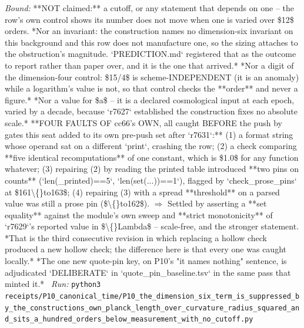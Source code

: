 \begin{description}
 \emph{Bound:} **NOT claimed:** a cutoff, or any statement that depends on one -- the row's own control shows its number does not move when one is varied over \$12\$ orders.  *Nor an invariant: the construction names no dimension-six invariant on this background and this row does not manufacture one, so the sizing attaches to the obstruction's magnitude. `PREDICTION.md` registered that as the outcome to report rather than paper over, and it is the one that arrived.*  *Nor a digit of the dimension-four control: \$15/4\$ is scheme-INDEPENDENT (it is an anomaly) while a logarithm's value is not, so that control checks the **order** and never a figure.*  *Nor a value for \$a\$ -- it is a declared cosmological input at each epoch, varied by a decade, because `r7627` established the construction fixes no absolute scale.*  **FOUR FAULTS OF cc66's OWN, all caught BEFORE the push by gates this seat added to its own pre-push set after `r7631`:** (1) a format string whose operand sat on a different `print`, crashing the row; (2) a check comparing **five identical recomputations** of one constant, which is \$1.0\$ for any function whatever; (3) repairing (2) by reading the printed table introduced **two pins on counts** (`len(\_printed)==5`, `len(set(...))==1`), flagged by `check\_prose\_pins` at \$161\textbackslash\{\}to163\$; (4) repairing (3) with a spread **threshold** on a parsed value was still a prose pin (\$\textbackslash\{\}to162\$). \ensuremath{\Rightarrow} Settled by asserting a **set equality** against the module's own sweep and **strict monotonicity** of `r7629`'s reported value in \$\textbackslash\{\}Lambda\$ -- scale-free, and the stronger statement.  *That is the third consecutive revision in which replacing a hollow check produced a new hollow check; the difference here is that every one was caught locally.*  *The one new quote-pin key, on P10's "it names nothing" sentence, is adjudicated `DELIBERATE` in `quote\_pin\_baseline.tsv` in the same pass that minted it.*
\ \emph{Run:} \texttt{python3 receipts/P10\_canonical\_time/P10\_the\_dimension\_six\_term\_is\_suppressed\_by\_the\_constructions\_own\_planck\_length\_over\_curvature\_radius\_squared\_and\_sits\_a\_hundred\_orders\_below\_measurement\_with\_no\_cutoff.py}
\end{description}\endgroup
